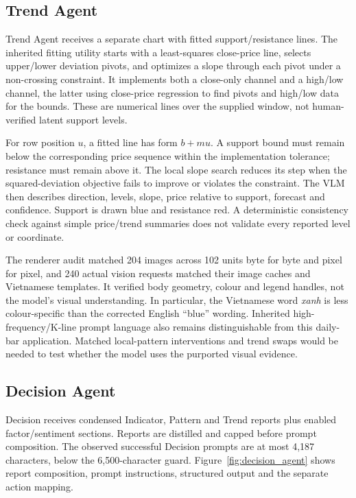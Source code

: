\subsection{Trend Agent}
Trend Agent receives a separate chart with fitted support/resistance lines. The inherited fitting utility starts with a least-squares close-price line, selects upper/lower deviation pivots, and optimizes a slope through each pivot under a non-crossing constraint. It implements both a close-only channel and a high/low channel, the latter using close-price regression to find pivots and high/low data for the bounds. These are numerical lines over the supplied window, not human-verified latent support levels.

For row position $u$, a fitted line has form $b+mu$. A support bound must remain below the corresponding price sequence within the implementation tolerance; resistance must remain above it. The local slope search reduces its step when the squared-deviation objective fails to improve or violates the constraint. The VLM then describes direction, levels, slope, price relative to support, forecast and confidence. Support is drawn blue and resistance red. A deterministic consistency check against simple price/trend summaries does not validate every reported level or coordinate.

The renderer audit matched 204 images across 102 units byte for byte and pixel for pixel, and 240 actual vision requests matched their image caches and Vietnamese templates. It verified body geometry, colour and legend handles, not the model's visual understanding. In particular, the Vietnamese word \emph{xanh} is less colour-specific than the corrected English ``blue'' wording. Inherited high-frequency/K-line prompt language also remains distinguishable from this daily-bar application. Matched local-pattern interventions and trend swaps would be needed to test whether the model uses the purported visual evidence.

\subsection{Decision Agent}
Decision receives condensed Indicator, Pattern and Trend reports plus enabled factor/sentiment sections. Reports are distilled and capped before prompt composition. The observed successful Decision prompts are at most 4,187 characters, below the 6,500-character guard. Figure~\ref{fig:decision_agent} shows report composition, prompt instructions, structured output and the separate action mapping.

